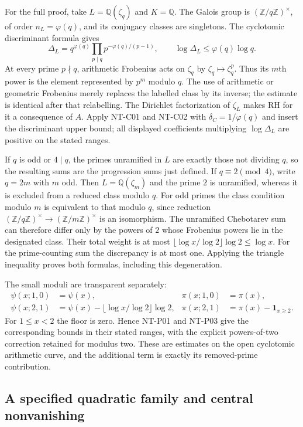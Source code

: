 \documentclass[11pt,a4paper]{article}
\begin{document}
For the full proof, take $L=\mathbb Q(\zeta_q)$ and $K=\mathbb Q$.
The Galois group is $(\mathbb Z/q\mathbb Z)^\times$, of order
$n_L=\varphi(q)$, and its conjugacy classes are singletons.
The cyclotomic discriminant formula gives
\[
 \Delta_L=q^{\varphi(q)}
    \prod_{p\mid q}p^{-\varphi(q)/(p-1)},\qquad
 \log\Delta_L\le\varphi(q)\log q.
\]
At every prime $p\nmid q$, arithmetic Frobenius acts on $\zeta_q$ by
$\zeta_q\mapsto\zeta_q^p$.  Thus its $m$th power is the element
represented by $p^m$ modulo $q$.  The use of arithmetic or geometric
Frobenius merely replaces the labelled class by its inverse; the estimate
is identical after that relabelling.  The Dirichlet factorization of
$\zeta_L$ makes RH for it a consequence of $A$.
Apply NT-C01 and NT-C02 with $\delta_C=1/\varphi(q)$ and insert the
discriminant upper bound; all displayed coefficients multiplying
$\log\Delta_L$ are positive on the stated ranges.

If $q$ is odd or $4\mid q$, the primes unramified in $L$ are exactly
those not dividing $q$, so the resulting sums are the progression sums
just defined.  If $q\equiv2\pmod4$, write $q=2m$ with $m$ odd.
Then $L=\mathbb Q(\zeta_m)$ and the prime $2$ is unramified, whereas it
is excluded from a reduced class modulo $q$.  For odd primes the class
condition modulo $m$ is equivalent to that modulo $q$, since reduction
$(\mathbb Z/q\mathbb Z)^\times\to(\mathbb Z/m\mathbb Z)^\times$ is
an isomorphism.  The unramified Chebotarev sum can therefore differ only
by the powers of $2$ whose Frobenius powers lie in the designated class.
Their total weight is at most
$\lfloor\log x/\log2\rfloor\log2\le\log x$.
For the prime-counting sum the discrepancy is at most one.  Applying the
triangle inequality proves both formulas, including this degeneration.

The small moduli are transparent separately:
\begin{align*}
 \psi(x;1,0)&=\psi(x),& \pi(x;1,0)&=\pi(x),\\
 \psi(x;2,1)&=\psi(x)-\lfloor\log x/\log2\rfloor\log2,&
 \pi(x;2,1)&=\pi(x)-\mathbf1_{x\ge2}.
\end{align*}
For $1\le x<2$ the floor is zero.  Hence NT-P01 and NT-P03 give the
corresponding bounds in their stated ranges, with the explicit powers-of-two
correction retained for modulus two.  These are estimates on the open
cyclotomic arithmetic curve, and the additional term is exactly its
removed-prime contribution.

\subsection{A specified quadratic family and central nonvanishing}
\end{document}
